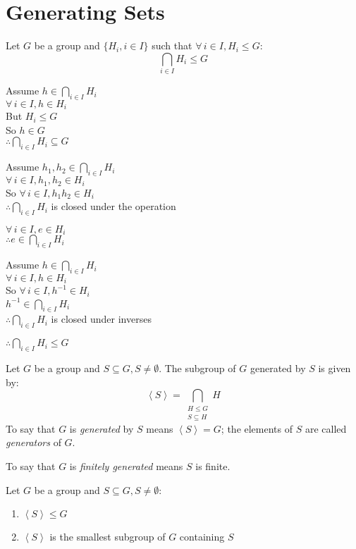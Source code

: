 \documentclass[letterpaper,12pt,fleqn]{article}
\newcommand{\cycle}[1]{\left<#1\right>}
\begin{document}
\section*{Generating Sets}
\begin{theorem}
  Let $G$ be a group and $\{H_i,i\in I\}$ such that $\forall\,i\in I,H_i\le G$:
  \[\bigcap_{i\in I}H_i\le G\]
\end{theorem}

\begin{theproof}
  Assume $h\in\bigcap_{i\in I}H_i$ \\
  $\forall\,i\in I,h\in H_i$ \\
  But $H_i\le G$ \\
  So $h\in G$ \\
  $\therefore\bigcap_{i\in I}H_i\subseteq G$

  Assume $h_1,h_2\in\bigcap_{i\in I}H_i$ \\
  $\forall\,i\in I,h_1,h_2\in H_i$ \\
  So $\forall\,i\in I,h_1h_2\in H_i$ \\
  $\therefore\bigcap_{i\in I}H_i$ is closed under the operation

  $\forall\,i\in I,e\in H_i$ \\
  $\therefore e\in\bigcap_{i\in I}H_i$

  Assume $h\in\bigcap_{i\in I}H_i$ \\
  $\forall\,i\in I,h\in H_i$ \\
  So $\forall\,i\in I,h^{-1}\in H_i$ \\
  $h^{-1}\in\bigcap_{i\in I}H_i$ \\
  $\therefore\bigcap_{i\in I}H_i$ is closed under inverses

  $\therefore\bigcap_{i\in I}H_i\le G$
\end{theproof}

\begin{definition}
  Let $G$ be a group and $S\subseteq G,S\ne\emptyset$. The subgroup of $G$
  generated by $S$ is given by:
  \[\cycle{S}=\bigcap_{\substack{H\le G \\ S\subseteq H}}H\]
  To say that $G$ is \emph{generated} by $S$ means $\cycle{S}=G$; the elements
  of $S$ are called \emph{generators} of $G$.

  To say that $G$ is \emph{finitely generated} means $S$ is finite.
\end{definition}

\begin{corollary}
  Let $G$ be a group and $S\subseteq G,S\ne\emptyset$:
  \begin{enumerate}
  \item $\cycle{S}\le G$
  \item $\cycle{S}$ is the smallest subgroup of $G$ containing $S$
  \end{enumerate}
\end{corollary}
\end{document}

